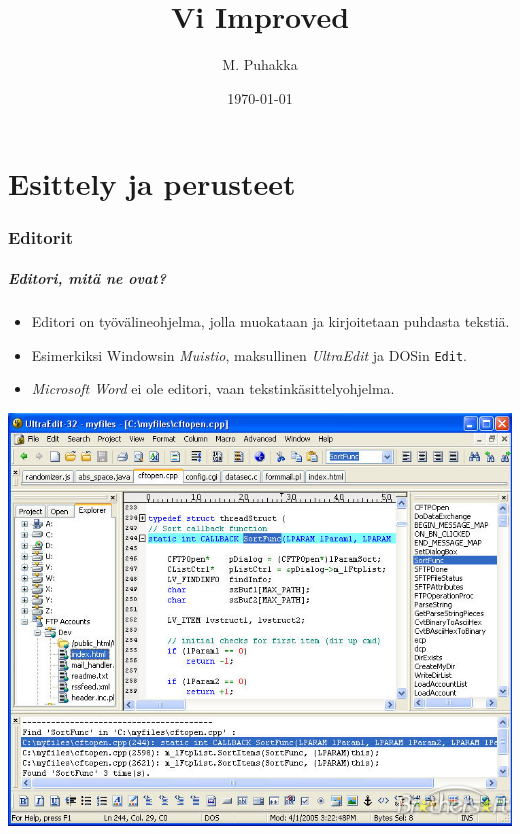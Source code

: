 \documentclass[]{beamer}
\title[Vim]{Vi Improved}
\author{M. Puhakka}
\date{\today}
\newcommand{\Gohj}[1]{\emph{#1}}
\newcommand{\Tohj}[1]{\texttt{#1}}
\begin{document}

\part {Esittely ja perusteet}

\section{Editorit}
\begin{frame}
    \frametitle{Editori, mitä ne ovat?}
    \begin{itemize}
        \item Editori on työvälineohjelma, jolla muokataan ja kirjoitetaan puhdasta tekstiä.
        \pause
        \item Esimerkiksi Windowsin \Gohj{Muistio}, maksullinen \Gohj{UltraEdit} ja DOSin \Tohj{Edit}. 
        \item  \Gohj{Microsoft Word} ei ole editori, vaan tekstinkäsittelyohjelma.
    \end{itemize}
\end{frame}

\begin{frame}[plain]
  \includegraphics[width=\textwidth]{ultraedit-32-16752-1}
\end{frame}
\end{document}
